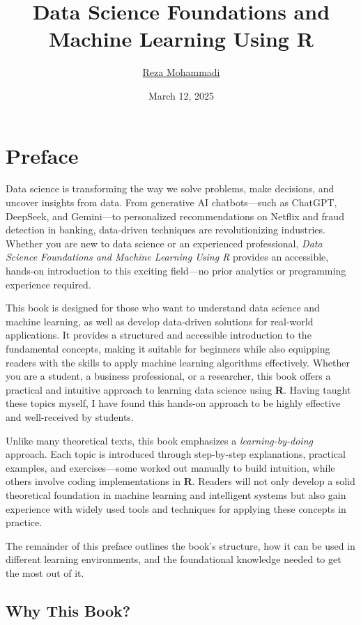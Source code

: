\documentclass[
  11pt,
]{book}
\title{Data Science Foundations and Machine Learning Using R}
\author{\href{https://www.uva.nl/profile/a.mohammadi}{{Reza Mohammadi}}}
\date{March 12, 2025}
\theoremstyle{definition}
\theoremstyle{definition}
\theoremstyle{definition}
\theoremstyle{definition}
\theoremstyle{remark}
\begin{document}
\maketitle

{
\hypersetup{linkcolor=}
\setcounter{tocdepth}{2}
\tableofcontents
}
\chapter*{Preface}\label{preface}


Data science is transforming the way we solve problems, make decisions, and uncover insights from data. From generative AI chatbots---such as ChatGPT, DeepSeek, and Gemini---to personalized recommendations on Netflix and fraud detection in banking, data-driven techniques are revolutionizing industries. Whether you are new to data science or an experienced professional, \emph{Data Science Foundations and Machine Learning Using R} provides an accessible, hands-on introduction to this exciting field---no prior analytics or programming experience required.

This book is designed for those who want to understand data science and machine learning, as well as develop data-driven solutions for real-world applications. It provides a structured and accessible introduction to the fundamental concepts, making it suitable for beginners while also equipping readers with the skills to apply machine learning algorithms effectively. Whether you are a student, a business professional, or a researcher, this book offers a practical and intuitive approach to learning data science using \textbf{R}. Having taught these topics myself, I have found this hands-on approach to be highly effective and well-received by students.

Unlike many theoretical texts, this book emphasizes a \emph{learning-by-doing} approach. Each topic is introduced through step-by-step explanations, practical examples, and exercises---some worked out manually to build intuition, while others involve coding implementations in \textbf{R}. Readers will not only develop a solid theoretical foundation in machine learning and intelligent systems but also gain experience with widely used tools and techniques for applying these concepts in practice.

The remainder of this preface outlines the book's structure, how it can be used in different learning environments, and the foundational knowledge needed to get the most out of it.

\section*{Why This Book?}\label{why-this-book}
\end{document}
